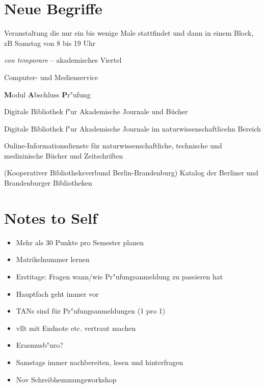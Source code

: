 \documentclass[]{scrartcl}
\begin{document}
\section{Neue Begriffe}

\begin{description}[leftmargin=!,labelwidth=\widthof{\bfseries Blockveranstaltung}]
  \item[Blockveranstaltung] Veranstaltung die nur ein bis wenige Male stattfindet und dann in einem Block, zB Samstag von 8 bis 19 Uhr
  \item[ct] \emph{con temporare} -- akademisches Viertel
  \item[CMS] Computer- und Medienservice
  \item[MAP] \textbf{M}odul \textbf{A}bschluss \textbf{P}r"ufung
  \item[jstor] Digitale Bibliothek f"ur Akademische Journale und Bücher
  \item[Wiley] Digitale Bibliothek f"ur Akademische Journale im naturwissenschaftlicehn Bereich
  \item[Springerlink] Online-Informationsdienste für naturwissenschaftliche, technische und medizinische Bücher und Zeitschriften
  \item[KOBV] (Kooperativer Bibliotheksverbund Berlin-Brandenburg) Katalog der Berliner und Brandenburger Bibliotheken
\end{description}



\section{Notes to Self}

\begin{itemize}
    \item Mehr als 30 Punkte pro Semester planen
    \item Matrikelnummer lernen
    \item Erstitage: Fragen wann/wie Pr"ufungsanmeldung zu passieren hat
    \item Hauptfach geht immer vor
    \item TANs sind für Pr"ufungsanmeldungen (1 pro 1)
    \item vllt mit Endnote etc. vertraut machen
    \item Erasmusb"uro?
    \item Samstags immer nachbereiten, lesen und hinterfragen
    \item Nov Schreibhemmungsworkshop
  \end{itemize}
\end{document}

